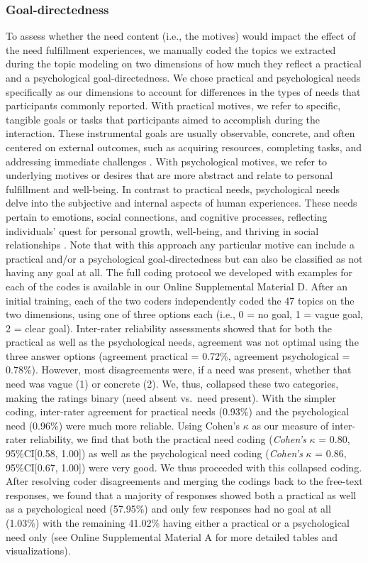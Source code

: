 \subsubsection{Goal-directedness}

To assess whether the need content (i.e., the motives) would impact the
effect of the need fulfillment experiences, we manually coded the topics
we extracted during the topic modeling on two dimensions of how much
they reflect a practical and a psychological goal-directedness. We chose
practical and psychological needs specifically as our dimensions to
account for differences in the types of needs that participants commonly
reported. With practical motives, we refer to specific, tangible goals or
tasks that participants aimed to accomplish during the interaction.
These instrumental goals are usually observable, concrete, and often
centered on external outcomes, such as acquiring resources, completing
tasks, and addressing immediate challenges \citep[][]{}. With
psychological motives, we refer to underlying motives or desires that are
more abstract and relate to personal fulfillment and well-being. In
contrast to practical needs, psychological needs delve into the
subjective and internal aspects of human experiences. These needs
pertain to emotions, social connections, and cognitive processes,
reflecting individuals' quest for personal growth, well-being, and
thriving in social relationships \citep[][]{}. Note that with this
approach any particular motive can include a practical and/or a
psychological goal-directedness but can also be classified as not having
any goal at all. The full coding protocol we developed with examples for
each of the codes is available in our Online Supplemental Material D.
After an initial training, each of the two coders independently coded
the 47 topics on the two dimensions, using one of three options each
(i.e., 0 = no goal, 1 = vague goal, 2 = clear goal). Inter-rater
reliability assessments showed that for both the practical as well as
the psychological needs, agreement was not optimal using the three
answer options (agreement practical = 0.72\%, agreement psychological =
0.78\%). However, most disagreements were, if a need was present,
whether that need was vague (1) or concrete (2). We, thus, collapsed
these two categories, making the ratings binary (need absent vs.~need
present). With the simpler coding, inter-rater agreement for practical
needs (0.93\%) and the psychological need (0.96\%) were much more
reliable. Using Cohen's \(\kappa\) as our measure of inter-rater
reliability, we find that both the practical need coding
(\textit{Cohen's} \(\kappa\) = 0.80, 95\%CI{[}0.58, 1.00{]}) as well as
the psychological need coding (\textit{Cohen's} \(\kappa\) = 0.86,
95\%CI{[}0.67, 1.00{]}) were very good. We thus proceeded with this
collapsed coding. After resolving coder disagreements and merging the
codings back to the free-text responses, we found that a majority of
responses showed both a practical as well as a psychological need
(57.95\%) and only few responses had no goal at all (1.03\%) with the
remaining 41.02\% having either a practical or a psychological need only
(see Online Supplemental Material A for more detailed tables and
visualizations).

